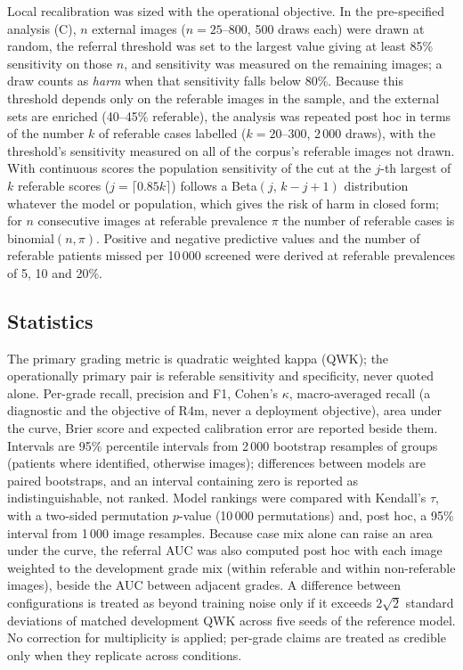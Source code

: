 Local recalibration was sized with the operational objective. In the pre-specified analysis (C),
$n$ external images ($n=25$--800, 500 draws each) were drawn at random, the referral threshold was
set to the largest value giving at least 85\% sensitivity on those $n$, and sensitivity was measured
on the remaining images; a draw counts as \emph{harm} when that sensitivity falls below 80\%. Because
this threshold depends only on the referable images in the sample, and the external sets are
enriched (40--45\% referable), the analysis was repeated post hoc in terms of the number $k$ of
referable cases labelled ($k=20$--300, 2\,000 draws), with the threshold's sensitivity measured on
all of the corpus's referable images not drawn. With continuous scores the population sensitivity of
the cut at the $j$-th largest of $k$ referable scores ($j=\lceil0.85k\rceil$) follows a
Beta$(j,\,k-j+1)$ distribution whatever the model or population, which gives the risk of harm in
closed form; for $n$ consecutive images at referable prevalence $\pi$ the number of referable cases
is binomial$(n,\pi)$. Positive and negative predictive values and the number of referable patients
missed per 10\,000 screened were derived at referable prevalences of 5, 10 and 20\%.

\subsection{Statistics}

The primary grading metric is quadratic weighted kappa (QWK)\cite{cohen1968kappa}; the
operationally primary pair is referable sensitivity and specificity, never quoted alone.
Per-grade recall, precision and F1, Cohen's $\kappa$, macro-averaged recall (a diagnostic and the
objective of R4m, never a deployment objective), area under the curve, Brier score and expected
calibration error are reported
beside them. Intervals are 95\% percentile intervals from 2\,000 bootstrap resamples of groups
(patients where identified, otherwise images); differences between models are paired bootstraps,
and an interval containing zero is reported as indistinguishable, not ranked. Model rankings were
compared with Kendall's $\tau$, with a two-sided permutation $p$-value (10\,000 permutations) and,
post hoc, a 95\% interval from 1\,000 image resamples. Because case mix alone can raise an area
under the curve, the referral AUC was also computed post hoc with each image weighted to the
development grade mix (within referable and within non-referable images), beside the AUC between
adjacent grades. A difference between configurations is treated as beyond training
noise only if it exceeds $2\sqrt{2}$ standard deviations of matched development QWK across five
seeds of the reference model. No correction for multiplicity is applied; per-grade claims are
treated as credible only when they replicate across conditions.

